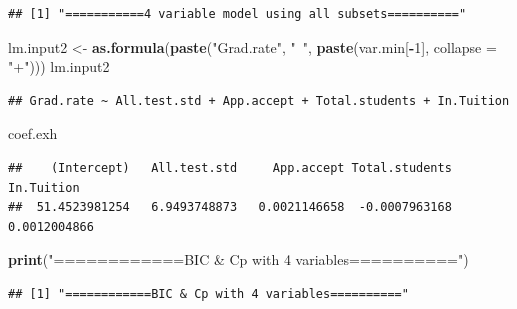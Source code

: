 \documentclass[]{article}
\newenvironment{Shaded}{\begin{snugshade}}{\end{snugshade}}
\newcommand{\KeywordTok}[1]{\textcolor[rgb]{0.13,0.29,0.53}{\textbf{#1}}}
\newcommand{\DataTypeTok}[1]{\textcolor[rgb]{0.13,0.29,0.53}{#1}}
\newcommand{\DecValTok}[1]{\textcolor[rgb]{0.00,0.00,0.81}{#1}}
\newcommand{\StringTok}[1]{\textcolor[rgb]{0.31,0.60,0.02}{#1}}
\newcommand{\CommentTok}[1]{\textcolor[rgb]{0.56,0.35,0.01}{\textit{#1}}}
\newcommand{\OperatorTok}[1]{\textcolor[rgb]{0.81,0.36,0.00}{\textbf{#1}}}
\newcommand{\NormalTok}[1]{#1}
\begin{document}
\begin{verbatim}
## [1] "===========4 variable model using all subsets=========="
\end{verbatim}

\begin{Shaded}
\begin{Highlighting}[]
\NormalTok{lm.input2 <-}\StringTok{ }\KeywordTok{as.formula}\NormalTok{(}\KeywordTok{paste}\NormalTok{(}\StringTok{"Grad.rate"}\NormalTok{, }\StringTok{"~"}\NormalTok{, }\KeywordTok{paste}\NormalTok{(var.min[}\OperatorTok{-}\DecValTok{1}\NormalTok{], }\DataTypeTok{collapse =} \StringTok{"+"}\NormalTok{)))}
\NormalTok{lm.input2}
\end{Highlighting}
\end{Shaded}

\begin{verbatim}
## Grad.rate ~ All.test.std + App.accept + Total.students + In.Tuition
\end{verbatim}

\begin{Shaded}
\begin{Highlighting}[]
\NormalTok{coef.exh}
\end{Highlighting}
\end{Shaded}

\begin{verbatim}
##    (Intercept)   All.test.std     App.accept Total.students     In.Tuition 
##  51.4523981254   6.9493748873   0.0021146658  -0.0007963168   0.0012004866
\end{verbatim}

\begin{Shaded}
\begin{Highlighting}[]
\KeywordTok{print}\NormalTok{(}\StringTok{"============BIC & Cp with 4 variables=========="}\NormalTok{)}
\end{Highlighting}
\end{Shaded}

\begin{verbatim}
## [1] "============BIC & Cp with 4 variables=========="
\end{verbatim}

\begin{Shaded}
\end{Shaded}
\end{document}
